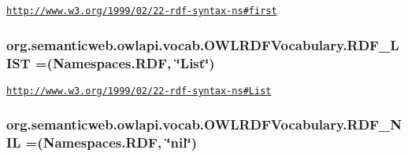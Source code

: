 \href{http://www.w3.org/1999/02/22-rdf-syntax-ns#first}{\tt http\-://www.\-w3.\-org/1999/02/22-\/rdf-\/syntax-\/ns\#first} \hypertarget{enumorg_1_1semanticweb_1_1owlapi_1_1vocab_1_1_o_w_l_r_d_f_vocabulary_a6db0861017521f1d7f443d10cff23abd}{
\subsubsection[{R\-D\-F\-\_\-\-L\-I\-S\-T}]{\setlength{\rightskip}{0pt plus 5cm}org.\-semanticweb.\-owlapi.\-vocab.\-O\-W\-L\-R\-D\-F\-Vocabulary.\-R\-D\-F\-\_\-\-L\-I\-S\-T =({\bf Namespaces.\-R\-D\-F}, \char`\"{}List\char`\"{})}}\label{enumorg_1_1semanticweb_1_1owlapi_1_1vocab_1_1_o_w_l_r_d_f_vocabulary_a6db0861017521f1d7f443d10cff23abd}
\href{http://www.w3.org/1999/02/22-rdf-syntax-ns#List}{\tt http\-://www.\-w3.\-org/1999/02/22-\/rdf-\/syntax-\/ns\#\-List} \hypertarget{enumorg_1_1semanticweb_1_1owlapi_1_1vocab_1_1_o_w_l_r_d_f_vocabulary_adce895a458ec27f5acad1ee96ceef82c}{
\subsubsection[{R\-D\-F\-\_\-\-N\-I\-L}]{\setlength{\rightskip}{0pt plus 5cm}org.\-semanticweb.\-owlapi.\-vocab.\-O\-W\-L\-R\-D\-F\-Vocabulary.\-R\-D\-F\-\_\-\-N\-I\-L =({\bf Namespaces.\-R\-D\-F}, \char`\"{}nil\char`\"{})}}\label{enumorg_1_1semanticweb_1_1owlapi_1_1vocab_1_1_o_w_l_r_d_f_vocabulary_adce895a458ec27f5acad1ee96ceef82c}
